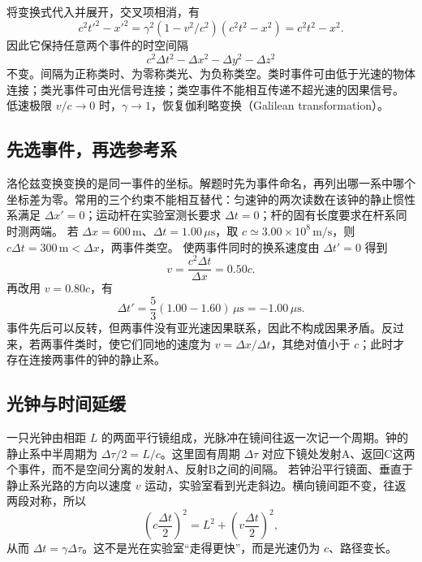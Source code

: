 将变换式代入并展开，交叉项相消，有
\[
 c^2t'^2-x'^2=\gamma^2(1-v^2/c^2)(c^2t^2-x^2)=c^2t^2-x^2.
\]
因此它保持任意两个事件的时空间隔
\begin{equation}
 c^2\Delta t^2-\Delta x^2-\Delta y^2-\Delta z^2
\end{equation}
不变。间隔为正称类时、为零称类光、为负称类空。类时事件可由低于光速的物体连接；类光事件可由光信号连接；类空事件不能相互传递不超光速的因果信号。
低速极限 $v/c\to0$ 时，$\gamma\to1$，恢复伽利略变换（Galilean transformation）。


\subsection{先选事件，再选参考系}
洛伦兹变换变换的是同一事件的坐标。解题时先为事件命名，再列出哪一系中哪个坐标差为零。常用的三个约束不能相互替代：匀速钟的两次读数在该钟的静止惯性系满足 $\Delta x'=0$；运动杆在实验室测长要求 $\Delta t=0$；杆的固有长度要求在杆系同时测两端。
若 $\Delta x=600\,\mathrm m$、$\Delta t=1.00\,\mu\mathrm s$，取 $c\simeq3.00\times10^8\,\mathrm{m/s}$，则 $c\Delta t=300\,\mathrm m<\Delta x$，两事件类空。
使两事件同时的换系速度由 $\Delta t'=0$ 得到
\[
 v=\frac{c^2\Delta t}{\Delta x}=0.50c.
\]
再改用 $v=0.80c$，有
\[
 \Delta t'=\frac53(1.00-1.60)\,\mu\mathrm s=-1.00\,\mu\mathrm s.
\]
事件先后可以反转，但两事件没有亚光速因果联系，因此不构成因果矛盾。反过来，若两事件类时，使它们同地的速度为 $v=\Delta x/\Delta t$，其绝对值小于 $c$；此时才存在连接两事件的钟的静止系。

\subsection{光钟与时间延缓}

一只光钟由相距 $L$ 的两面平行镜组成，光脉冲在镜间往返一次记一个周期。钟的静止系中半周期为
$\Delta\tau/2=L/c$。这里固有周期 $\Delta\tau$ 对应下镜处发射A、返回C这两个事件，而不是空间分离的发射A、反射B之间的间隔。
若钟沿平行镜面、垂直于静止系光路的方向以速度 $v$ 运动，实验室看到光走斜边。横向镜间距不变，往返两段对称，所以
\begin{equation}
 \left(c\frac{\Delta t}{2}\right)^2
 =L^2+\left(v\frac{\Delta t}{2}\right)^2,
\end{equation}
从而 $\Delta t=\gamma\Delta\tau$。这不是光在实验室“走得更快”，而是光速仍为 $c$、路径变长。

